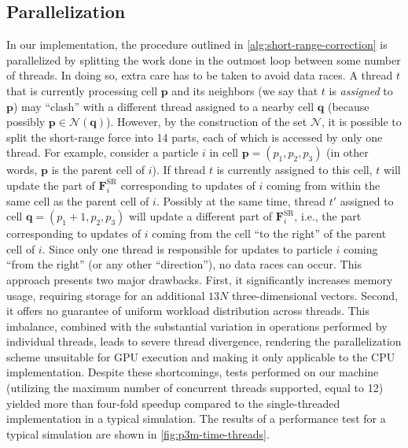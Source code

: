 \subsection{Parallelization}
In our implementation, the procedure outlined in \autoref{alg:short-range-correction} is parallelized by splitting the work done in the outmost loop between some number of threads.
In doing so, extra care has to be taken to avoid data races.
A thread $t$ that is currently processing cell $\mathbf{p}$ and its neighbors (we say that $t$ is \textit{assigned} to $\mathbf{p}$) may ``clash'' with a different thread assigned to a nearby cell $\mathbf{q}$ (because possibly $\mathbf{p} \in \mathcal{N}(\mathbf{q})$).
However, by the construction of the set $\mathcal{N}$, it is possible to split the short-range force into 14 parts, each of which is accessed by only one thread.
For example, consider a particle $i$ in cell $\mathbf{p} = (p_1, p_2, p_3)$ (in other words, $\mathbf{p}$ is the parent cell of $i$).
If thread $t$ is currently assigned to this cell, $t$ will update the part of $\mathbf{F}^\text{SR}_i$ corresponding to updates of $i$ coming from within the same cell as the parent cell of $i$.
Possibly at the same time, thread $t'$ assigned to cell $\mathbf{q} = (p_1+1, p_2, p_3)$ will update a different part of $\mathbf{F}^\text{SR}_i$, i.e., the part corresponding to updates of $i$ coming from the cell ``to the right'' of the parent cell of $i$.
Since only one thread is responsible for updates to particle $i$ coming ``from the right'' (or any other ``direction''), no data races can occur.
This approach presents two major drawbacks.
First, it significantly increases memory usage, requiring storage for an additional $13N$ three-dimensional vectors.
Second, it offers no guarantee of uniform workload distribution across threads.
This imbalance, combined with the substantial variation in operations performed by individual threads, leads to severe thread divergence, rendering the parallelization scheme unsuitable for GPU execution and making it only applicable to the CPU implementation.
Despite these shortcomings, tests performed on our machine (utilizing the maximum number of concurrent threads supported, equal to 12) yielded more than four-fold speedup compared to the single-threaded implementation in a typical simulation.
The results of a performance test for a typical simulation are shown in \autoref{fig:p3m-time-threads}.
